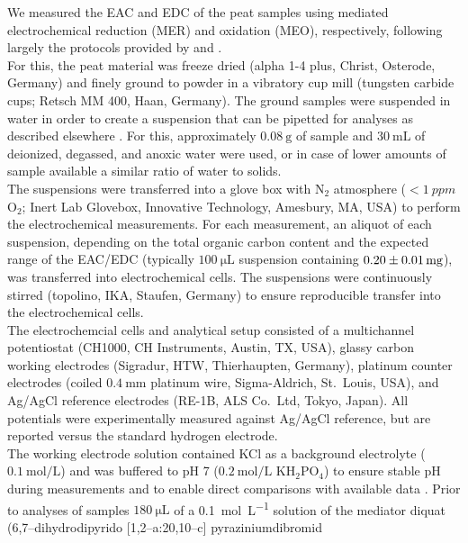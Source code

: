 \documentclass[draft,linenumbers]{agujournal2018}
\begin{document}
We measured the EAC and EDC of the peat samples using mediated
electrochemical reduction (MER) and oxidation (MEO), respectively,
following largely the protocols provided by \citet{Lau.2015} and
\citet{Gao.2019}.\\
For this, the peat material was freeze dried (alpha 1-4 plus, Christ,
Osterode, Germany) and finely ground to powder in a vibratory cup mill
(tungsten carbide cups; Retsch MM 400, Haan, Germany). The ground
samples were suspended in water in order to create a suspension that can
be pipetted for analyses as described elsewhere \citep{Lau.2015}. For
this, approximately \(\SI{0.08}{\g}\) of sample and
\(\SI{30}{\milli\L}\) of deionized, degassed, and anoxic water were
used, or in case of lower amounts of sample available a similar ratio of
water to solids.\\
The suspensions were transferred into a glove box with N\(_2\)
atmosphere (\(<\SI{1}{ppm}\) O\(_2\); Inert Lab Glovebox, Innovative
Technology, Amesbury, MA, USA) to perform the electrochemical
measurements. For each measurement, an aliquot of each suspension,
depending on the total organic carbon content and the expected range of
the EAC/EDC (typically \(\SI{100}{\micro\L}\) suspension containing
\(\SI[separate-uncertainty=true, multi-part-units = single]{0.2 \pm 0.01}{\milli\g}\)),
was transferred into electrochemical cells. The suspensions were
continuously stirred (topolino, IKA, Staufen, Germany) to ensure
reproducible transfer into the electrochemical cells.\\
The electrochemcial cells and analytical setup consisted of a
multichannel potentiostat (CH1000, CH Instruments, Austin, TX, USA),
glassy carbon working electrodes (Sigradur, HTW, Thierhaupten, Germany),
platinum counter electrodes (coiled \(\SI{0.4}{\milli\m}\) platinum
wire, Sigma-Aldrich, St.~Louis, USA), and Ag/AgCl reference electrodes
(RE-1B, ALS Co.~Ltd, Tokyo, Japan). All potentials were experimentally
measured against Ag/AgCl reference, but are reported versus the standard
hydrogen electrode.\\
The working electrode solution contained KCl as a background electrolyte
(\(\SI{0.1}{\mol\per\L}\)) and was buffered to pH 7
(\(\SI{0.2}{\mol\per\L}\) KH\(_2\)PO\(_4\)) to ensure stable pH during
measurements \citep{Aeschbacher.2011} and to enable direct comparisons
with available data \citep{Aeschbacher.2010, Walpen.2018, Tan.2017}.
Prior to analyses of samples \(\SI{180}{\micro\L}\) of a
\SI{0.1}{\mol\per\L} solution of the mediator diquat
(6,7--dihydrodipyrido {[}1,2--a:20,10--c{]} pyraziniumdibromid
\end{document}
